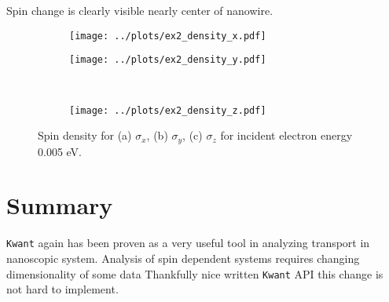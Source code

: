 \documentclass[a4paper, 12pt]{article}
\begin{document}
Spin change is clearly visible nearly center of nanowire.

\begin{figure}[H]
    \begin{center}
        \begin{subfigure}{0.49\textwidth}
            \texttt{[image: ../plots/ex2\_density\_x.pdf]}
            \caption{}
        \end{subfigure}
        \begin{subfigure}{0.49\textwidth}
            \texttt{[image: ../plots/ex2\_density\_y.pdf]}
            \caption{}
        \end{subfigure}
        \\
        \begin{subfigure}{0.49\textwidth}
            \texttt{[image: ../plots/ex2\_density\_z.pdf]}
            \caption{}
        \end{subfigure}
    \end{center}
    \caption{Spin density for (a) $\sigma_x$, (b) $\sigma_y$, (c) $\sigma_z$ for incident electron energy 0.005 eV.}
    \label{fig:ex2_spin_map}
\end{figure}

\section*{Summary}

\texttt{Kwant} again has been proven as a very useful tool in analyzing transport in nanoscopic system.
Analysis of spin dependent systems requires changing dimensionality of some data
Thankfully nice written \texttt{Kwant} API this change is not hard to implement.
\end{document}
